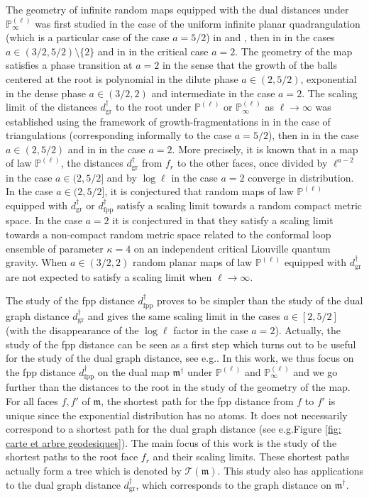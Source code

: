 \documentclass[11pt]{article}
\numberwithin{equation}{section}
\def \T{\mathcal{T}}
\def\P{\mathbb{P}}
\begin{document}
The geometry of infinite random maps {equipped with the dual distances} under $\P^{(\ell)}_\infty$ was first studied in the case of the uniform infinite planar quadrangulation (which is a particular case of the case $a=5/2$) in \cite{CLG17} and \cite{CC18}, then in \cite{BC} in the cases $a\in (3/2,5/2)\setminus\{2\}$ and in \cite{BCM} in the critical case $a=2$.  {The geometry of the map satisfies a phase transition at $a=2$ in the sense that the growth of the balls centered at the root is polynomial in the dilute phase $a\in (2,5/2)$, exponential in the dense phase $a \in (3/2,2)$ and intermediate in the case $a=2$.} The scaling limit of the distances $d^\dagger_\mathrm{gr}$ to the root under $\P^{(\ell)}$ or $\P^{(\ell)}_\infty$ as $\ell \to \infty$ was established using the framework of growth-fragmentations in \cite{BCK} in the case of triangulations (corresponding informally to the case $a=5/2$), then in \cite{BBCK} in the case $a \in (2,5/2)$ and in \cite{Kam23CLE} in the case $a=2$. {More precisely, it is known that in a map of law $\P^{(\ell)}$, the distances $d^\dagger_\mathrm{gr}$ from $f_r$ to the other faces, once divided by $\ell^{a-2}$ in the case $a\in (2,5/2]$ and by $\log \ell$ in the case $a=2$ converge in distribution. In the case $a \in (2,5/2]$, it is conjectured that random maps of law $\P^{(\ell)}$ equipped with $d^\dagger_\mathrm{gr}$ or $d^\dagger_\mathrm{fpp}$ satisfy a scaling limit towards a random compact metric space. In the case $a=2$ it is conjectured in \cite{Kam23CLE} that they satisfy a scaling limit towards a non-compact random metric space related to the conformal loop ensemble of parameter $\kappa=4$ on an independent critical Liouville quantum gravity. When $a \in (3/2,2)$ random planar maps of law $\P^{(\ell)}$ equipped with $d^\dagger_\mathrm{gr}$ are not expected to satisfy a scaling limit when $\ell \to \infty$.}

{The study of the fpp distance $d^\dagger_\mathrm{fpp}$ proves to be simpler than the study of the dual graph distance $d^\dagger_\mathrm{gr}$ and gives the same scaling limit in the cases $a \in [2,5/2]$ (with the disappearance of the $\log \ell$ factor in the case $a=2$). Actually, the study of the fpp distance can be seen as a first step which turns out to be useful for the study of the dual graph distance, see e.g.\@ \cite{BC, BCM, Kam23, Kam23CLE}. In this work, we thus focus on the fpp distance $d^\dagger_{\mathrm{fpp}}$ on the dual map $\mathfrak{m}^\dagger$ under $\P^{(\ell)}$ and $\P^{(\ell)}_\infty$ and we go further than the distances to the root in the study of the geometry of the map.} For {all} faces $f,f'$ of $\mathfrak{m}$, the shortest path for the fpp distance from $f$ to $f'$ is unique since the exponential distribution has no atom{s}. It does not necessarily correspond to a shortest path for the dual graph distance (see e.g.\@ Figure \ref{fig: carte et arbre geodesiques}). The main focus of this work is the study of the shortest paths to the root face $f_r$ and their scaling limits. These shortest paths actually form a tree which is denoted by $\T(\mathfrak{m})$. This study also has applications to the dual graph distance $d^\dagger_{\mathrm{gr}}$, which corresponds to the graph distance on $\mathfrak{m}^\dagger$.
\end{document}
